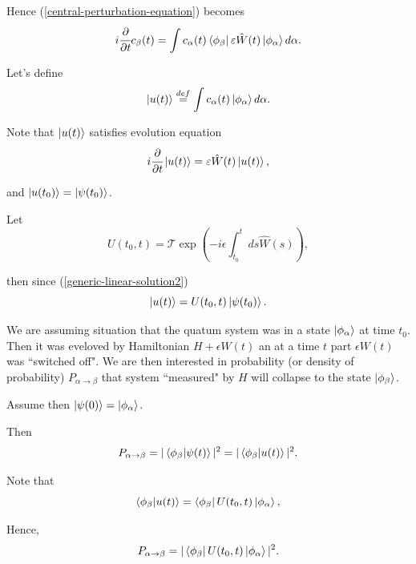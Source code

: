 \documentclass[main.tex]{subfiles}
\begin{document}
Hence (\ref{central-perturbation-equation}) becomes
\begin{equation}
i\cfrac{\partial}{\partial t} c_\beta(t) = \int c_\alpha(t)\bra{\phi_\beta}\varepsilon \hat{W}(t) \ket{\phi_\alpha}d\alpha.
\end{equation}

Let's define
\begin{equation}
\ket{u(t)} \stackrel{def}{=}  \int c_\alpha(t) \ket{\phi_\alpha} d\alpha.
\end{equation}

Note that $\ket{u(t)}$ satisfies evolution equation
\begin{equation}
i\cfrac{\partial}{\partial t} \ket{u(t)} = \varepsilon \hat{W}(t) \ket{u(t)},
\end{equation}

and $\ket{u(t_0)} = \ket{\psi(t_0)}$.

Let 
\begin{equation}
U(t_0, t) = \mathcal{T} \exp(-i\epsilon \int_{t_0}^t ds \hat{W}(s)),
\end{equation}

then since (\ref{generic-linear-solution2})
\begin{equation}
\ket{u(t)} = U(t_0, t) \ket{\psi(t_0)}.
\end{equation}

We are assuming situation that the quatum system was in a state $\ket{\phi_\alpha}$ at time $t_0$. Then it was eveloved by Hamiltonian $H + \epsilon W(t)$ an at a time $t$ part $\epsilon W(t)$ was ``switched off". We are then interested in probability (or density of probability) $P_{\alpha \to \beta}$ that system ``measured" by $H$ will collapse to the state $\ket{\phi_\beta}$.

Assume then $\ket{\psi(0)} = \ket{\phi_\alpha}$.

Then
\begin{equation}
P_{\alpha \to \beta} = |\bra{\phi_\beta}\ket{\psi(t)}|^2 = |\bra{\phi_\beta}\ket{u(t)}|^2.
\end{equation}

Note that
\begin{equation}
\bra{\phi_\beta}\ket{u(t)} = \bra{\phi_\beta} U(t_0, t) \ket{\phi_\alpha},
\end{equation}

Hence,
\begin{equation}
P_{\alpha \to \beta} = |\bra{\phi_\beta} U(t_0, t) \ket{\phi_\alpha}|^2.
\end{equation}
\end{document}
